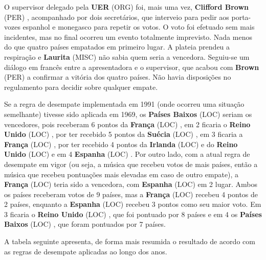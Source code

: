 \documentclass[12pt,a4paper]{article}
\begin{document}
O supervisor delegado pela \textbf{UER} (ORG) foi, mais uma vez, \textbf{Clifford Brown} (PER) , acompanhado por dois secretários, que interveio para pedir aos porta-vozes espanhol e monegasco para repetir os votos. O voto foi efetuado sem mais incidentes, mas no final ocorreu um evento totalmente imprevisto. Nada menos do que quatro países empatados em primeiro lugar. A plateia prendeu a respiração e \textbf{Laurita} (MISC) não sabia quem seria a vencedora. Seguiu-se um diálogo em francês entre a apresentadora e o supervisor, que acabou com \textbf{Brown} (PER) a confirmar a vitória dos quatro países. Não havia disposições no regulamento para decidir sobre qualquer empate.

Se a regra de desempate implementada em 1991 (onde ocorreu uma situação semelhante) tivesse sido aplicada em 1969, os \textbf{Países Baixos} (LOC) seriam os vencedores, pois receberam 6 pontos da \textbf{França} (LOC) , em 2 ficaria o \textbf{Reino Unido} (LOC) , por ter recebido 5 pontos da \textbf{Suécia} (LOC) , em 3 ficaria a \textbf{França} (LOC) , por ter recebido 4 pontos da \textbf{Irlanda} (LOC) e do \textbf{Reino Unido} (LOC) e em 4 \textbf{Espanha} (LOC) . Por outro lado, com a atual regra de desempate em vigor (ou seja, a música que recebeu votos de mais países, então a música que recebeu pontuações mais elevadas em caso de outro empate), a \textbf{França} (LOC) teria sido a vencedora, com \textbf{Espanha} (LOC) em 2 lugar. Ambos os países receberam votos de 9 países, mas a \textbf{França} (LOC) recebeu 4 pontos de 2 países, enquanto a \textbf{Espanha} (LOC) recebeu 3 pontos como seu maior voto. Em 3 ficaria o \textbf{Reino Unido} (LOC) , que foi pontuado por 8 países e em 4 os \textbf{Países Baixos} (LOC) , que foram pontuados por 7 países.

A tabela seguinte apresenta, de forma mais resumida o resultado de acordo com as regras de desempate aplicadas ao longo dos anos.
\end{document}
